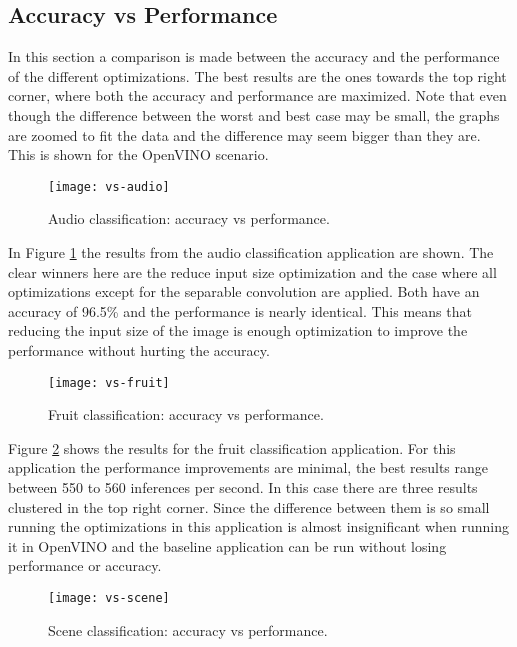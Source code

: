 \subsection{Accuracy vs Performance}

In this section a comparison is made between the accuracy and the performance of the different optimizations. The best results are the ones towards the top right corner, where both the accuracy and performance are maximized. Note that even though the difference between the worst and best case may be small, the graphs are zoomed to fit the data and the difference may seem bigger than they are. This is shown for the OpenVINO scenario.

\begin{figure}[thbp]
	\centering
	\texttt{[image: vs-audio]}
	\caption{Audio classification: accuracy vs performance.}
	\label{fig:vs-audio}
\end{figure}

In Figure \ref{fig:vs-audio} the results from the audio classification application are shown. The clear winners here are the reduce input size optimization and the case where all optimizations except for the separable convolution are applied. Both have an accuracy of 96.5\% and the performance is nearly identical. This means that reducing the input size of the image is enough optimization to improve the performance without hurting the accuracy.

\begin{figure}[thbp]
	\centering
	\texttt{[image: vs-fruit]}
	\caption{Fruit classification: accuracy vs performance.}
	\label{fig:vs-fruit}
\end{figure}

Figure \ref{fig:vs-fruit} shows the results for the fruit classification application. For this application the performance improvements are minimal, the best results range between 550 to 560 inferences per second. In this case there are three results clustered in the top right corner. Since the difference between them is so small running the optimizations in this application is almost insignificant when running it in OpenVINO and the baseline application can be run without losing performance or accuracy.

\begin{figure}[thbp]
	\centering
	\texttt{[image: vs-scene]}
	\caption{Scene classification: accuracy vs performance.}
	\label{fig:vs-scene}
\end{figure}

